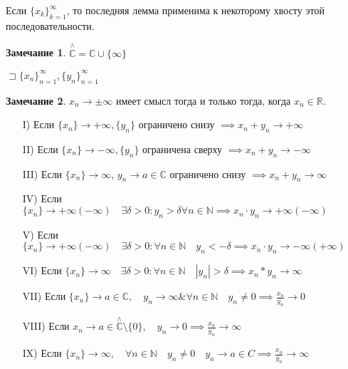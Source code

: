 \documentclass{book}
\newcommand\N{\ensuremath{\mathbb{N}}}
\newcommand\R{\ensuremath{\mathbb{R}}}
\renewcommand\C{\ensuremath{\mathbb{C}}}
\theoremstyle{definition}
\newtheorem*{note}{Замечание}
\begin{document}
    Если $\{x_k\}_{k=1}^{\infty }$, то последняя лемма применима к некоторому хвосту этой последовательности. 
    \begin{note}
        $\overset{\land}{\C} = \C\cup \{\infty \}$
    \end{note}
    \begin{theorem}

        $\sqsupset \{x_{n} \}_{n=1}^{\infty }, \{y_{n} \}_{n=1}^{\infty }$

    \begin{note}
        $x_{n} \to \pm \infty $ имеет смысл тогда и только тогда, когда $x_{n} \in \R$.
    \end{note}

        \begin{itemize}
            \item [I)] Если $\{x_{n}\} \to +\infty , \{y_{n}\} $ ограничено снизу $\implies  x_{n} +y_{n} \to  +\infty $ 
            \item [II)] Если $\{x_{n} \} \to -\infty , \{y_{n} \}$ ограничена сверху $\implies  x_{n} +y_{n} \to -\infty $
            \item [III)] Если $\{x_{n} \} \to \infty$, $y_n\to a\in \C$ ограничено снизу $\implies x_{n} +y_{n} \to \infty $
            \item [IV)] Если $\{x_{n} \} \to  +\infty(-\infty ) \quad \exists \delta >0: y_{n} >\delta \forall n\in \N  \implies x_{n} \cdot y_{n} \to +\infty (-\infty )$
            \item [V)] Если $\{x_{n} \} \to +\infty (-\infty )\quad \exists \delta >0:\forall n\in \N \quad y_{n} <-\delta \implies x_{n} \cdot y_{n}  \to -\infty (+\infty )$
            \item [VI)] Если $\{x_{n} \} \to  \infty \quad \exists \delta >0: \forall n\in \N  \quad |y_{n}|>\delta \implies x_{n} *y_{n}  \to \infty $
            \item [VII)] Если $\{x_{n} \} \to a\in \C, \quad y_{n} \to \infty \& \forall n\in \N \quad y_{n} \neq 0 \implies \frac{x_{n} }{y_{n} }  \to  0$
            \item [VIII)] Если $x_{n} \to a\in \overset{\land}{\C}\setminus \{0\}, \quad y_{n} \to  0 \implies  \frac{x_{n} }{y_{n} }\to \infty $
            \item [IX)] Если $\{x_{n} \} \to  \infty , \quad \forall n\in \N \quad y_{n} \neq 0\quad y_{n} \to a\in C \implies \frac{x_{n} }{y_{n} } \to \infty $
        \end{itemize}
    \end{theorem}
\end{document}
